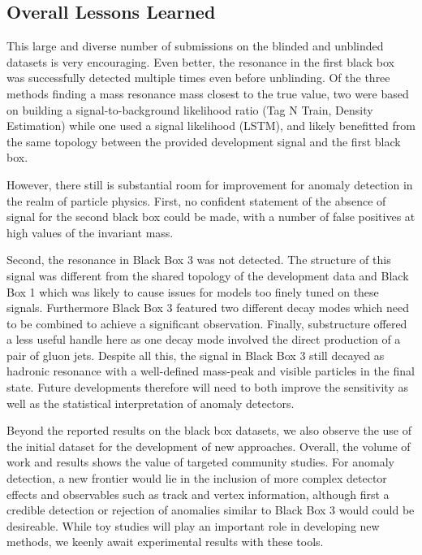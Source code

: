 \documentclass[a4paper,11pt]{article}
\begin{document}
\subsection{Overall Lessons Learned}
\label{sec:discussion_lessons}

This large and diverse number of submissions on the blinded and unblinded datasets is very encouraging. Even better,
the resonance in the first black box was successfully detected multiple times even before unblinding. 
Of the three methods finding a mass resonance mass closest to the true value, two were based on 
building a signal-to-background likelihood ratio (Tag N Train, Density Estimation) while one 
used a signal likelihood (LSTM), and likely benefitted from the same topology between the provided
development signal and the first black box. 

However, there still is substantial room for improvement for anomaly detection in the realm of particle physics.
First, no confident statement of the absence of signal for the second black box could be made, with a number
of false positives at high values of the invariant mass. 

Second, the resonance in Black Box 3 was not detected. The structure of this 
signal was different from the shared topology of the development data and Black Box 1
which was likely to cause issues for models too finely tuned on these signals. 
Furthermore Black Box 3 featured two different decay modes which need to be combined
to achieve a significant observation. Finally, substructure offered a less useful handle here
as one decay mode involved the direct production of a pair of gluon jets.
Despite all this, the signal in Black Box 3 
still decayed as hadronic resonance with a well-defined mass-peak and visible particles in the final state.
Future developments therefore will need to both improve the sensitivity as well as the statistical interpretation
of anomaly detectors.

Beyond the reported results on the black box datasets, we also observe the use of the initial dataset for
the development of new approaches. Overall, the volume of work and results shows the 
value of targeted community studies. For anomaly detection, a new frontier would lie in the inclusion of more complex
detector effects and observables such as track and vertex information, although first a credible detection or
rejection of anomalies similar to Black Box 3 would could be desireable. While toy studies will play an important role
in developing new methods, we keenly await experimental results with these tools.
\end{document}
